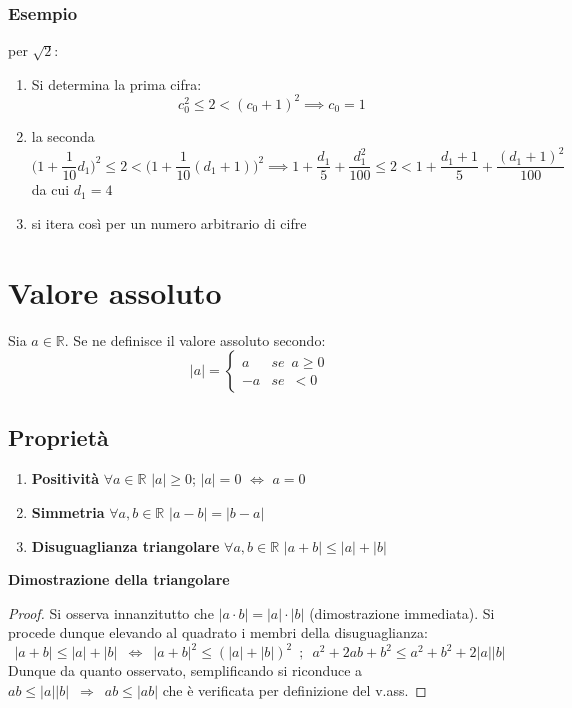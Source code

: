\documentclass[10pt, oneside]{book}
\theoremstyle{plain}
\begin{document}
\subsubsection{Esempio} per $\sqrt{2}$:
\begin{enumerate}
\item Si determina la prima cifra:
\[c_0^2 \leq 2 < (c_0 + 1)^2 \implies c_0 = 1\]
\item la seconda
\[\big(1 + \frac{1}{10}d_1\big)^2 \leq 2 < \big(1 + \frac{1}{10}(d_1+1)\big)^2 \implies 1 + \frac{d_1}{5} + \frac{d_1^2}{100} \leq 2 < 1 + \frac{d_1+1}{5} + \frac{(d_1+1)^2}{100}\]
da cui $d_1 = 4$
\item si itera così per un numero arbitrario di cifre
\end{enumerate}

\section{Valore assoluto}
\begin{defin}
    Sia $a \in \mathbb{R}$. Se ne definisce il valore assoluto secondo:
    \[|a| = \begin{cases}
        a & se \enspace a \geq 0\\
        -a & se \enspace < 0 
    \end{cases}\]
\end{defin}
\subsection*{Proprietà}
\begin{enumerate}
    \item \textbf{Positività} $\forall a \in \mathbb{R}$ $|a| \geq 0$; $|a| = 0$ $\Leftrightarrow$ $a = 0$
    \item \textbf{Simmetria} $\forall a,b \in \mathbb{R}$ $|a - b| = |b - a|$
    \item \textbf{Disuguaglianza triangolare} $\forall a,b \in \mathbb{R}$ $|a+b| \leq |a| + |b|$
\end{enumerate}
\textbf{Dimostrazione della triangolare}
\begin{proof}
    Si osserva innanzitutto che $|a \cdot b| = |a| \cdot |b|$ (dimostrazione immediata). Si procede dunque elevando al quadrato i membri della disuguaglianza:
    \[|a+b| \leq |a| + |b| \enspace \Leftrightarrow \enspace |a + b|^2 \leq (|a| + |b|)^2 \enspace ; \enspace a^2 +2ab + b^2 \leq a^2 + b^2 + 2 |a| |b|\]
    Dunque da quanto osservato, semplificando si riconduce a $ab \leq |a||b| \enspace \Rightarrow \enspace ab \leq |ab|$ che è verificata per definizione del v.ass.
\end{proof}
\end{document}
